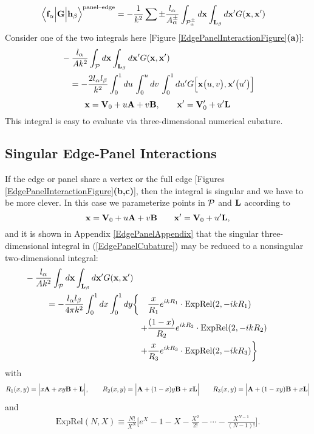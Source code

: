 \documentclass[letterpaper]{article}
\begin{document}
\begin{align*}
\Big\langle \mathbf{f}_\alpha \Big| \mathbf{G} \Big| \mathbf{h}_\beta \Big\rangle^{\hbox{\scriptsize{panel--edge}}}
&=-\frac{1}{k^2}\sum\pm \frac{l_\alpha}{A_\alpha^\pm}
   \int_{\mathcal{P}_\alpha^\pm} d\mathbf{x} \int_{\mathbf{L}_\beta} d\mathbf{x}^\prime
   G(\mathbf{x}, \mathbf{x}^\prime)
\end{align*}
Consider one of the two integrals here 
[Figure \ref{EdgePanelInteractionFigure}\textbf{(a)}]:
\begin{align}
&
 -\frac{l_\alpha}{Ak^2 }
   \int_{\mathcal{P}} d\mathbf{x} \int_{\mathbf{L}_\beta} d\mathbf{x}^\prime
   G(\mathbf{x}, \mathbf{x}^\prime)
\nonumber \\
&\quad=
 -\frac{2l_\alpha l_\beta}{k^2 }
  \int_0^1 du \, \int_0^u dv \, \int_0^1 du^\prime
   G\Big[\mathbf{x}\big(u,v\big), \mathbf{x}^\prime\big(u^\prime\big)\Big]
\label{EdgePanelCubature}
\end{align}
$$ \mathbf{x} = \mathbf{V}_0 + u\mathbf{A} + v\mathbf{B}, \qquad 
   \mathbf{x}^\prime = \mathbf{V}_0^\prime + u^\prime\mathbf{L}
$$
This integral is easy to evaluate via three-dimensional
numerical cubature.

\subsection*{Singular Edge-Panel Interactions}

If the edge or panel share a vertex or the full 
edge [Figures \ref{EdgePanelInteractionFigure}\textbf{(b,c)}],
then the integral is singular and we have to be more clever.
In this case we parameterize points in $\mathcal{P}$ and $\mathbf{L}$ 
according to
$$ \mathbf{x} = \mathbf{V}_0 + u\mathbf{A} + v\mathbf{B}
   \qquad
   \mathbf{x}^\prime = \mathbf{V}_0 + u^\prime \mathbf{L},
$$
and it is shown in Appendix \ref{EdgePanelAppendix}
that the singular three-dimensional integral in (\ref{EdgePanelCubature})
may be reduced to a nonsingular two-dimensional integral:
\begin{align}
&\hspace{-2in}
 -\frac{l_\alpha}{Ak^2}
   \int_{\pan} d\vb x \int_{\vb L_\beta} d\vb x^\prime
   G(\vb x, \vb x^\prime)
\\
 =
 -\frac{l_\alpha l_\beta}{4\pi k^2}\int_0^1 dx \int_0^1 dy \bigg\{
 \quad &\frac{x}{R_1} e^{ikR_1} \cdot \text{ExpRel}(2,-ikR_1)
\\
      +&\frac{(1-x)}{R_2} e^{ikR_2} \cdot \text{ExpRel}(2,-ikR_2)
\\
      +&\frac{x}{R_3}e^{ikR_3} \cdot \text{ExpRel}(2,-ikR_3)
  \bigg\}
\end{align}
with
$$ R_1(x,y)=\Big| x\mathbf{A} + xy \mathbf{B} + \mathbf{L} \Big|,
   \qquad
   R_2(x,y)=\Big| \mathbf{A} + (1-x)y \mathbf{B} + x\mathbf{L}\Big|
   \qquad
   R_3(x,y)=\Big| \mathbf{A} + (1-xy) \mathbf{B} + x\mathbf{L}\Big|
$$
and
\begin{align*}
 \text{ExpRel}(N,X) \equiv
 \frac{N!}{X^N}\Big[e^{X} - 1 - X - \frac{X^2}{2!} - \cdots 
                             - \frac{X^{N-1}}{(N-1)!} \Big].
\end{align*}
\end{document}
